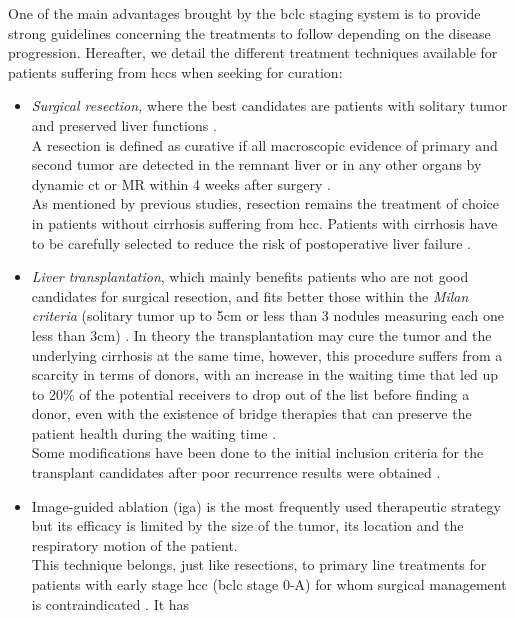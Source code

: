 One of the main advantages brought by the \ac{bclc} staging system is
to provide strong guidelines concerning the treatments to follow
depending on the disease progression.
Hereafter, we detail the different treatment techniques available for
patients suffering from \ac{hcc}s when seeking for curation:
\begin{itemize}
\item \emph{Surgical resection,} where the best candidates are patients with
  solitary tumor and preserved liver functions \cite{Forner2018}.\\
  A resection is defined as curative if all macroscopic evidence of
  primary and second tumor are detected in the remnant liver or in any
  other organs by dynamic \ac{ct} or MR within 4 weeks after surgery
  \cite{Yang2012}.\\
  As mentioned by previous studies, resection remains the treatment of
  choice in patients without cirrhosis suffering from \ac{hcc}. Patients with
  cirrhosis have to be carefully selected to reduce the risk of
  postoperative liver failure \cite{Bruix2011,Llovet2012,Verslype2012}.
\item
  \emph{Liver transplantation}, which mainly benefits patients who are
  not good candidates for surgical resection, and fits better those
  within the \emph{Milan criteria} (solitary tumor up to 5cm or less
  than 3 nodules measuring each one less than 3cm) \cite{Llovet2012,Mazzaferro2011}. In theory the transplantation may cure the
  tumor and the underlying cirrhosis at the same time, however, this
  procedure suffers from a scarcity in terms of donors, with an increase
  in the waiting time that led up to 20\% of the potential receivers to
  drop out of the list before finding a donor, even with the existence
  of bridge therapies that can preserve the patient health during the
  waiting time \cite{Llovet1999}.\\
  Some modifications have been done to the initial inclusion criteria
  for the transplant candidates after poor recurrence results were
  obtained \cite{Llovet2012}.
\item Image-guided ablation (\ac{iga}) is the most frequently used
  therapeutic strategy but its efficacy is limited by the size of the
  tumor, its location and the respiratory motion of the patient.\\
  This technique belongs, just like resections, to primary line
  treatments for patients with early stage \ac{hcc} (\ac{bclc} stage 0-A)
  for whom surgical management is contraindicated \cite{Bruix2011,Heimbach2018}. It has

\end{itemize}
